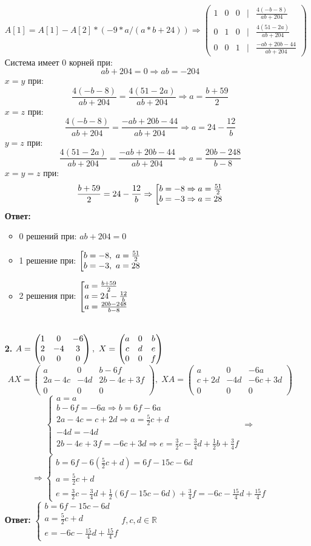 \documentclass[a4paper]{article}
\makeatletter
\newcommand{\mat}[1]{\begin{pmatrix} #1 \end{pmatrix}}
\renewcommand{\f}[2]{\frac{#1}{#2}}
\newcommand{\gath}[1]{\left[ \begin{array}{@{}l@{}} #1 \end{array} \right.}
\newcommand{\case}[1]{\begin{cases} #1 \end{cases}}
\newcommand{\ts}{\text{\space}}
\renewcommand{\r}{\Rightarrow}
\newcommand{\RR}{\mathbb{R}}
\makeatother
\begin{document}
\begin{enumerate}
    $$A[1] = A[1]-A[2]*(-9*a/(a*b + 24)) \r \mat{1 & 0 & 0 & | & \f{4(-b - 8)}{a b + 204} \\ 0 & 1 & 0 & | & \f{4(51 - 2a)}{a b + 204} \\ 0 & 0 & 1 & | & \f{-a b + 20 b - 44}{a b + 204}}$$
    Система имеет 0 корней при:
    $$ab+204 = 0 \r ab = -204$$
    $x = y$ при:
    $$\f{4(-b - 8)}{a b + 204} = \f{4(51 - 2a)}{a b + 204} \r a = \f{b+59}{2}$$
    $x = z$ при:
    $$\f{4(-b - 8)}{a b + 204} = \f{-a b + 20 b - 44}{a b + 204} \r a = 24 - \f{12}{b}$$
    $y = z$ при:
    $$\f{4(51 - 2a)}{a b + 204} = \f{-a b + 20 b - 44}{a b + 204} \r a = \f{20b - 248}{b-8}$$
    $x = y = z$ при:
    $$\f{b+59}{2} = 24 - \f{12}{b} \r \gath{b=-8 \r a =\f{51}{2}\\ b=-3 \r a = 28} $$
    \textbf{Ответ:}\begin{itemize}
        \item 
        0 решений при: $ab+204 = 0$
        \item 
        1 решение при: $\gath{b=-8,\ts a =\f{51}{2}\\ b=-3,\ts a = 28}$
        \item 
        2 решения при: $\gath{a = \f{b+59}{2} \\ a = 24 - \f{12}{b} \\ a = \f{20b - 248}{b-8}}$\\\\
    \end{itemize}

    \item[\textbf{2.}]$A = \mat{1 & 0 & -6 \\ 2 & -4 & 3 \\ 0 & 0 & 0}, \ts X = \mat{a & 0 & b \\ c & d & e \\ 0 & 0 & f}$
    $$AX = \mat{a & 0 & b - 6f \\ 2a - 4c & -4d & 2b - 4e + 3f \\ 0 & 0 & 0}, \; XA = \mat{a & 0 & -6a \\ c + 2d & -4d & -6c + 3d \\ 0 & 0 & 0}$$
    $$\case{
        a = a\\
        b-6f = -6a\r b = 6f-6a\\
        2a-4c = c + 2d \r a = \f{5}{2}c + d\\
        -4d = -4d\\
        2b-4e+3f = -6c+3d \r e = \f{3}{2}c-\f{3}{4}d+\f{1}{2}b+\f{3}{4}f\\
    }\r$$
    $$\r \case{
        b = 6f-6(\f{5}{2}c + d)=6f-15c-6d \\
        a = \f{5}{2}c + d\\
        e = \f{3}{2}c-\f{3}{4}d+\f{1}{2}(6f-15c-6d)+\f{3}{4}f = -6c-\f{15}{4}d+\f{15}{4}f
    }$$
    \textbf{Ответ:} $\case{
        b = 6f-15c-6d\\
        a = \f{5}{2}c + d\\
        e = -6c-\f{15}{4}d+\f{15}{4}f
    } f, c, d \in \RR$


\end{enumerate}
\end{document}
